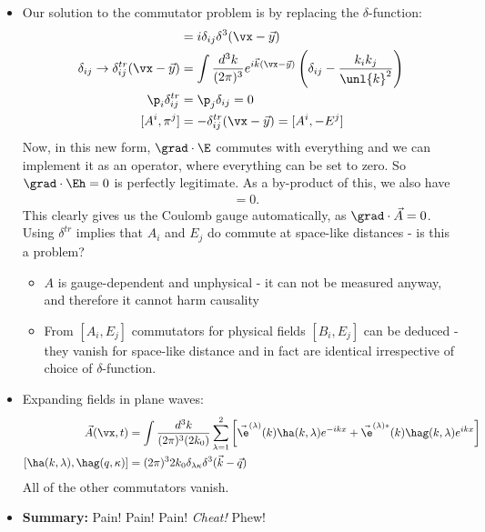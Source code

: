 \documentclass[a4paper, 11pt, normalem]{report}
\begin{document}
\begin{itemize}
    \item Our solution to the commutator problem is by replacing the $\delta$-function:
        \begin{align}
            [A^i,\pi^j] &= i\delta_{ij}\delta^3(\vx-\vec{y}) \\
            \delta_{ij} \to \delta_{ij}^{tr}(\vx-\vec{y}) &= \int \frac{d^3k}{(2\pi)^3} e^{i\vec{k}(\vx-\vec{y})}\left(\delta_{ij}-\frac{k_ik_j}{\unl{k}^2}\right) \\
            \p_i\delta_{ij}^{tr} &= \p_j\delta_{ij} = 0 \\
            [A^i,\pi^j] &= -\delta_{ij}^{tr}(\vx-\vec{y}) = [A^i,-E^j]
        \end{align}
        Now, in this new form, $\grad\cdot\E$ commutes with everything and we can implement it as an operator, where everything can be set to zero.
        So $\grad\cdot\Eh=0$ is perfectly legitimate.
        As a by-product of this, we also have
        \begin{align}
            [\grad\cdot\vec{A}_i,\Eh_j] &= 0.
        \end{align}
        This clearly gives us the Coulomb gauge automatically, as $\grad\cdot\vec{A}=0$.\\
        Using $\delta^{tr}$ implies that $A_i$ and $E_j$ do commute at space-like distances - is this a problem?
        \begin{itemize}
            \item $A$ is gauge-dependent and unphysical - it can not be measured anyway, and therefore it cannot harm causality
            \item From $[A_i,E_j]$ commutators for physical fields $[B_i,E_j]$ can be deduced - they vanish for space-like distance and in fact are identical irrespective of choice of $\delta$-function.
        \end{itemize}
    \item Expanding fields in plane waves:
        \begin{align}
            \vec{A}(\vx,t) &= \int\frac{d^3k}{(2\pi)^3(2k_0)} \sum_{\lambda=1}^2 \left[\vec{\e}^{(\lambda)}(k)\ha(k,\lambda)e^{-ikx} + \vec{\e}^{(\lambda)*}(k)\hag(k,\lambda)e^{ikx}\right] \\
            [\ha(k,\lambda),\hag(q,\kappa)] &= (2\pi)^32k_0\delta_{\lambda\kappa}\delta^3(\vec{k}-\vec{q})
        \end{align}
        All of the other commutators vanish.
    \item \textbf{Summary:} Pain! Pain! Pain! \textit{Cheat!} Phew!
\end{itemize}
\end{document}
